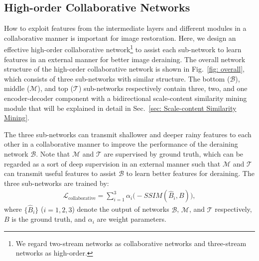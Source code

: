 \documentclass[letterpaper]{article} %
\begin{document}
\subsection{High-order Collaborative Networks}\label{sec: High-order Collaborative Progressive Network}
How to exploit features from the intermediate layers and different modules in a collaborative manner is important for image restoration.
%
Here, we design an effective high-order collaborative network\footnote{We regard two-stream networks as collaborative networks and three-stream networks as high-order.} to assist each sub-network to learn features in an external manner for better image deraining.
%
The overall network structure of the high-order collaborative network is shown in Fig.~\ref{fig: overall}, which consists of three sub-networks with similar structure.
%
The bottom ($\mathcal{B}$), middle ($\mathcal{M}$), and top ($\mathcal{T}$) sub-networks respectively contain three, two, and one encoder-decoder component with a bidirectional scale-content similarity mining module that will be explained in detail in Sec.~\ref{sec: Scale-content Similarity Mining}.
%

The three sub-networks can transmit shallower and deeper rainy features to each other in a collaborative manner to improve the performance of the deraining network $\mathcal{B}$.
%
Note that $\mathcal{M}$ and $\mathcal{T}$ are supervised by ground truth, which can be regarded as a sort of deep supervision in an external manner such that $\mathcal{M}$ and $\mathcal{T}$ can transmit useful features to assist $\mathcal{B}$ to learn better features for deraining.
The three sub-networks are trained by:
\begin{equation}
\begin{array}{ll}
\mathcal{L}_{\text{collaborative}} = \sum_{i=1}^{3}\alpha_{i} \big(-SSIM(\hat{B}_{i}, B)\big),
\end{array}
\label{eq:n0}
\end{equation}
where $\{\hat{B}_{i}\}$ ($ i = 1, 2, 3$) denote the output of networks $\mathcal{B}$, $\mathcal{M}$, and $\mathcal{T}$ respectively, $B$ is the ground truth, and $\alpha_{i}$ are weight parameters.
%
\end{document}

